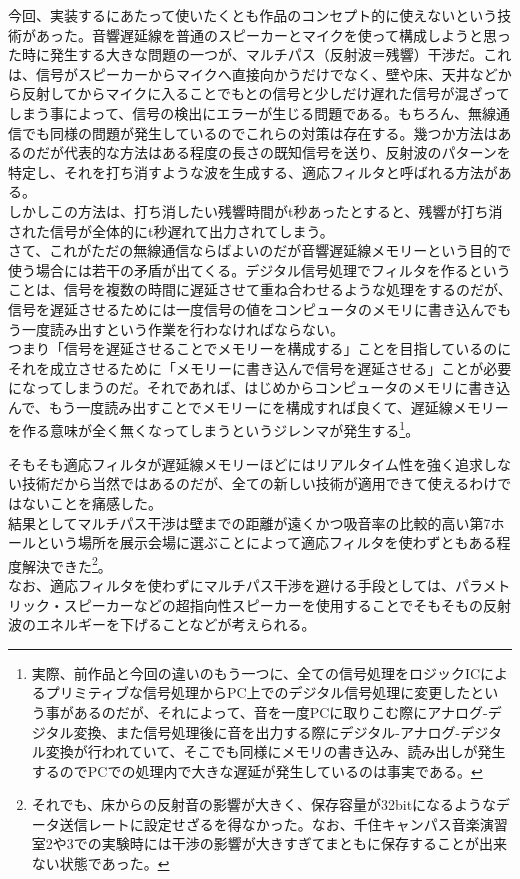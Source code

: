 \documentclass[a4paper,report]{jsbook}
\begin{document}
今回、実装するにあたって使いたくとも作品のコンセプト的に使えないという技術があった。音響遅延線を普通のスピーカーとマイクを使って構成しようと思った時に発生する大きな問題の一つが、マルチパス（反射波＝残響）干渉だ。これは、信号がスピーカーからマイクへ直接向かうだけでなく、壁や床、天井などから反射してからマイクに入ることでもとの信号と少しだけ遅れた信号が混ざってしまう事によって、信号の検出にエラーが生じる問題である。もちろん、無線通信でも同様の問題が発生しているのでこれらの対策は存在する。幾つか方法はあるのだが代表的な方法はある程度の長さの既知信号を送り、反射波のパターンを特定し、それを打ち消すような波を生成する、適応フィルタと呼ばれる方法がある。\\
しかしこの方法は、打ち消したい残響時間がt秒あったとすると、残響が打ち消された信号が全体的にt秒遅れて出力されてしまう\autocite{ochi:underwater}。\\
さて、これがただの無線通信ならばよいのだが音響遅延線メモリーという目的で使う場合には若干の矛盾が出てくる。デジタル信号処理でフィルタを作るということは、信号を複数の時間に遅延させて重ね合わせるような処理をするのだが、信号を遅延させるためには一度信号の値をコンピュータのメモリに書き込んでもう一度読み出すという作業を行わなければならない。\\
つまり「信号を遅延させることでメモリーを構成する」ことを目指しているのにそれを成立させるために「メモリーに書き込んで信号を遅延させる」ことが必要になってしまうのだ。それであれば、はじめからコンピュータのメモリに書き込んで、もう一度読み出すことでメモリーにを構成すれば良くて、遅延線メモリーを作る意味が全く無くなってしまうというジレンマが発生する\footnote{実際、前作品と今回の違いのもう一つに、全ての信号処理をロジックICによるプリミティブな信号処理からPC上でのデジタル信号処理に変更したという事があるのだが、それによって、音を一度PCに取りこむ際にアナログ-デジタル変換、また信号処理後に音を出力する際にデジタル-アナログ-デジタル変換が行われていて、そこでも同様にメモリの書き込み、読み出しが発生するのでPCでの処理内で大きな遅延が発生しているのは事実である。}。

そもそも適応フィルタが遅延線メモリーほどにはリアルタイム性を強く追求しない技術だから当然ではあるのだが、全ての新しい技術が適用できて使えるわけではないことを痛感した。\\
結果としてマルチパス干渉は壁までの距離が遠くかつ吸音率の比較的高い第7ホールという場所を展示会場に選ぶことによって適応フィルタを使わずともある程度解決できた\footnote{それでも、床からの反射音の影響が大きく、保存容量が32bitになるようなデータ送信レートに設定せざるを得なかった。なお、千住キャンパス音楽演習室2や3での実験時には干渉の影響が大きすぎてまともに保存することが出来ない状態であった。}。\\
なお、適応フィルタを使わずにマルチパス干渉を避ける手段としては、パラメトリック・スピーカーなどの超指向性スピーカーを使用することでそもそもの反射波のエネルギーを下げることなどが考えられる。
\end{document}
